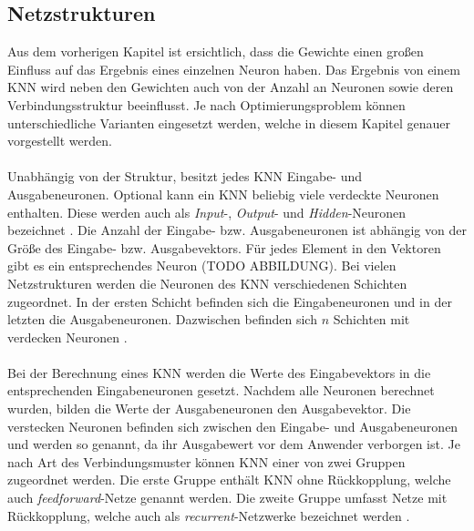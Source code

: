 \subsection{Netzstrukturen}
\label{subsec:network_structures}
Aus dem vorherigen Kapitel ist ersichtlich, dass die Gewichte einen großen Einfluss auf das Ergebnis eines einzelnen Neuron haben. Das Ergebnis von einem \ac{KNN} wird neben den Gewichten auch von der Anzahl an Neuronen sowie deren Verbindungsstruktur beeinflusst. Je nach Optimierungsproblem können unterschiedliche Varianten eingesetzt werden, welche in diesem Kapitel genauer vorgestellt werden. 
\\\\ %
Unabhängig von der Struktur, besitzt jedes \ac{KNN} Eingabe- und Ausgabeneuronen. Optional kann ein \ac{KNN} beliebig viele verdeckte Neuronen enthalten. Diese werden auch als \emph{Input}-, \emph{Output}- und \emph{Hidden}-Neuronen bezeichnet \cite{zell2003simulation}. Die Anzahl der Eingabe- bzw. Ausgabeneuronen ist abhängig von der Größe des Eingabe- bzw. Ausgabevektors. Für jedes Element in den Vektoren gibt es ein entsprechendes Neuron (TODO ABBILDUNG).
Bei vielen Netzstrukturen werden die Neuronen des \ac{KNN} verschiedenen Schichten zugeordnet. In der ersten Schicht befinden sich die Eingabeneuronen und in der letzten die Ausgabeneuronen. Dazwischen befinden sich $n$ Schichten mit verdecken Neuronen \cite{zell2003simulation}.
\\\\
Bei der Berechnung eines \ac{KNN} werden die Werte des Eingabevektors in die entsprechenden Eingabeneuronen gesetzt. Nachdem alle Neuronen berechnet wurden, bilden die Werte der Ausgabeneuronen den Ausgabevektor. Die verstecken Neuronen befinden sich zwischen den Eingabe- und Ausgabeneuronen und werden so genannt, da ihr Ausgabewert vor dem Anwender verborgen ist. Je nach Art des Verbindungsmuster können \ac{KNN} einer von zwei Gruppen zugeordnet werden. Die erste Gruppe enthält \ac{KNN} ohne Rückkopplung, welche auch \emph{feedforward}-Netze genannt werden. Die zweite Gruppe umfasst Netze mit Rückkopplung, welche auch als \emph{recurrent}-Netzwerke bezeichnet werden \cite{zell2003simulation}.
